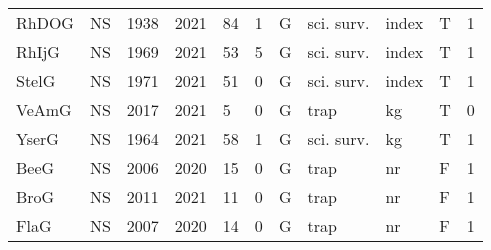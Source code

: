 \begin{table}[ht]
\begin{tabular}{p{1cm}p{1cm}p{1cm}p{1cm}p{0.8cm}p{0.8cm}p{1cm}p{2cm}p{2cm}p{1cm}p{1cm}}
  RhDOG & NS & 1938 & 2021 & 84 & 1 & G & sci. surv. & index & T & 1 \\ 
  RhIjG & NS & 1969 & 2021 & 53 & 5 & G & sci. surv. & index & T & 1 \\ 
  StelG & NS & 1971 & 2021 & 51 & 0 & G & sci. surv. & index & T & 1 \\ 
  VeAmG & NS & 2017 & 2021 & 5 & 0 & G & trap & kg & T & 0 \\ 
  YserG & NS & 1964 & 2021 & 58 & 1 & G & sci. surv. & kg & T & 1 \\ 
  BeeG & NS & 2006 & 2020 & 15 & 0 & G & trap & nr & F & 1 \\ 
  BroG & NS & 2011 & 2021 & 11 & 0 & G & trap & nr & F & 1 \\ 
  FlaG & NS & 2007 & 2020 & 14 & 0 & G & trap & nr & F & 1 \\ 
   \hline
\end{tabular}
\end{table}
